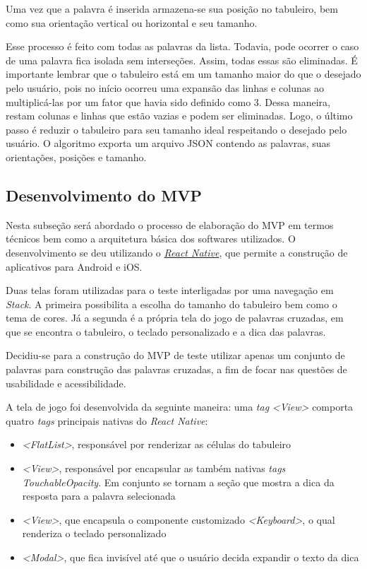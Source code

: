Uma vez que a palavra é inserida armazena-se sua posição no tabuleiro, bem como sua orientação vertical ou horizontal e seu tamanho.

Esse processo é feito com todas as palavras da lista. Todavia, pode ocorrer o caso de uma palavra fica isolada sem interseções. Assim, todas essas são eliminadas. É importante lembrar que o tabuleiro está em um tamanho maior do que o desejado pelo usuário, pois no início ocorreu uma expansão das linhas e colunas ao multiplicá-las por um fator que havia sido definido como 3. Dessa maneira, restam colunas e linhas que estão vazias e podem ser eliminadas. Logo, o último passo é reduzir o tabuleiro para seu tamanho ideal respeitando o desejado pelo usuário. O algoritmo exporta um arquivo JSON contendo as palavras, suas orientações, posições e tamanho.

\subsection{Desenvolvimento do MVP}
Nesta subseção será abordado o processo de elaboração do MVP em termos técnicos bem como a arquitetura básica dos softwares utilizados.
O desenvolvimento se deu utilizando o   \textit{\href{https://reactnative.dev/}{React Native}}, que permite a construção de aplicativos para Android e iOS.

Duas telas foram utilizadas para o teste interligadas por uma navegação em \textit{Stack}. A primeira possibilita a escolha do tamanho do tabuleiro bem como o tema de cores. Já a segunda é a própria tela do jogo de palavras cruzadas, em que se encontra o tabuleiro, o teclado personalizado e a dica das palavras.

Decidiu-se para a construção do MVP de teste utilizar apenas um conjunto de palavras para construção das palavras cruzadas, a fim de focar nas questões de usabilidade e acessibilidade.

A tela de jogo foi desenvolvida da seguinte maneira: uma \textit{tag} \textit{<View>} comporta quatro \textit{tags} principais nativas do \textit{React Native}:

\begin{itemize}
    \item \textit{<FlatList>}, responsável por renderizar as células do tabuleiro
    \item \textit{<View>}, responsável por encapsular as também nativas \textit{tags} \textit{TouchableOpacity}. Em conjunto se tornam a seção que mostra a dica da resposta para a palavra selecionada 
    \item \textit{<View>}, que encapsula o componente customizado \textit{<Keyboard>}, o qual renderiza o teclado personalizado
    \item \textit{<Modal>}, que fica invisível até que o usuário decida expandir o texto da dica
\end{itemize}

